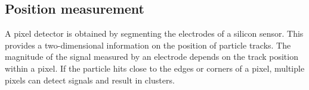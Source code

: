 




\subsection{Position measurement}

A pixel detector is obtained by segmenting the electrodes of a silicon
sensor. This provides a two-dimensional information on the position of
particle tracks. The magnitude of the signal measured by an electrode
depends on the track position within a pixel. If the particle hits
close to the edges or corners of a pixel, multiple pixels can detect
signals and result in clusters.

